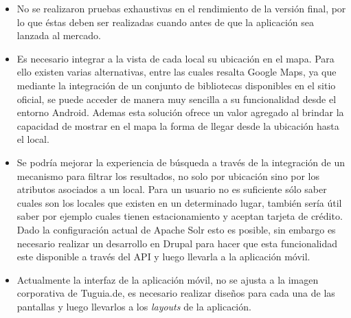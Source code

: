 \begin{itemize}
\item No se realizaron pruebas exhaustivas en el rendimiento de la versión final, por lo que
éstas deben ser realizadas cuando antes de que la aplicación sea lanzada al mercado.
\item Es necesario integrar a la vista de cada local su ubicación en el mapa. Para ello existen varias alternativas, entre las cuales resalta Google Maps, ya que mediante la integración de un conjunto de bibliotecas disponibles en el sitio oficial, se puede acceder de manera muy sencilla a su funcionalidad desde el entorno Android. Ademas esta solución ofrece un valor agregado al brindar la capacidad de mostrar en el mapa la forma de llegar desde la ubicación hasta el local.
\item Se podría mejorar la experiencia de búsqueda a través de la integración de un mecanismo para filtrar los resultados, no solo por ubicación sino por los atributos asociados a un local. Para un usuario no es suficiente sólo saber cuales son los locales que existen en un determinado lugar, también sería útil saber por ejemplo cuales tienen estacionamiento y aceptan tarjeta de crédito. Dado la configuración actual de Apache Solr esto es posible, sin embargo es necesario realizar un desarrollo en Drupal para hacer que esta funcionalidad este disponible a través del API y luego llevarla a la aplicación móvil. 
\item Actualmente la interfaz de la aplicación móvil, no se ajusta a la imagen corporativa de Tuguia.de, es necesario realizar diseños para cada una de las pantallas y luego llevarlos a los \textit{layouts} de la aplicación.

\end{itemize}
